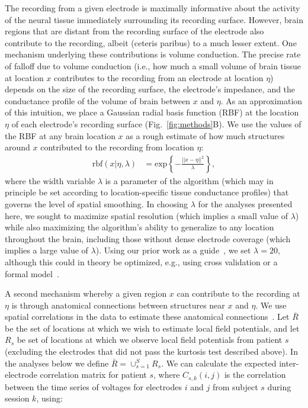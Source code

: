 \documentclass[11pt]{article}
\begin{document}
The recording from a given electrode is maximally informative about
the activity of the neural tissue immediately surrounding its
recording surface.  However, brain regions that are distant from the
recording surface of the electrode also contribute to the recording,
albeit (ceteris paribus) to a much lesser extent.  One mechanism
underlying these contributions is volume conduction.  The precise rate
of falloff due to volume conduction (i.e., how much a small volume of
brain tissue at location $x$ contributes to the recording from an
electrode at location $\eta$) depends on the size of the recording
surface, the electrode's impedance, and the conductance profile of the
volume of brain between $x$ and $\eta$.  As an approximation of this
intuition, we place a Gaussian radial basis function (RBF) at the
location $\eta$ of each electrode's recording surface
(Fig.~\ref{fig:methods}B).  We use the values of the RBF at any brain
location $x$ as a rough estimate of how much structures around $x$
contributed to the recording from location $\eta$:
\begin{align}
  \mathrm{rbf}(x|\eta,\lambda) & =
  \mathrm{exp}\left\{ -\frac{||x - \eta||^2}{\lambda} \right\},\label{eqn:rbf}
\end{align}
where the width variable $\lambda$ is a parameter of the algorithm
(which may in principle be set according to location-specific tissue
conductance profiles) that governs the level of spatial smoothing.  In
choosing $\lambda$ for the analyses presented here, we sought to
maximize spatial resolution (which implies a small value of $\lambda$)
while also maximizing the algorithm's ability to generalize to any
location throughout the brain, including those without dense electrode
coverage (which implies a large value of $\lambda$). Using our prior
work as a guide~\citep{MannEtal14b, MannEtal18}, we set $\lambda = 20$,
although this could in theory be optimized, e.g., using cross
validation or a formal model~\citep[e.g.,][]{MannEtal18}.

A second mechanism whereby a given region $x$ can contribute to the
recording at $\eta$ is through anatomical connections between
structures near $x$ and $\eta$.  We use spatial correlations in the
data to estimate these anatomical connections~\citep{BeckEtal18}.  Let
$\bar{R}$ be the set of locations at which we wish to estimate local
field potentials, and let $R_{s}$ be set of locations at which we
observe local field potentials from patient $s$ (excluding the
electrodes that did not pass the kurtosis test described above). In
the analyses below we define $\bar{R} = \cup_{s=1}^S R_s$.  We can
calculate the expected inter-electrode correlation matrix for patient
$s$, where $C_{s,k}(i,j)$ is the correlation between the time series
of voltages for electrodes $i$ and $j$ from subject $s$ during session
$k$, using:
\end{document}
